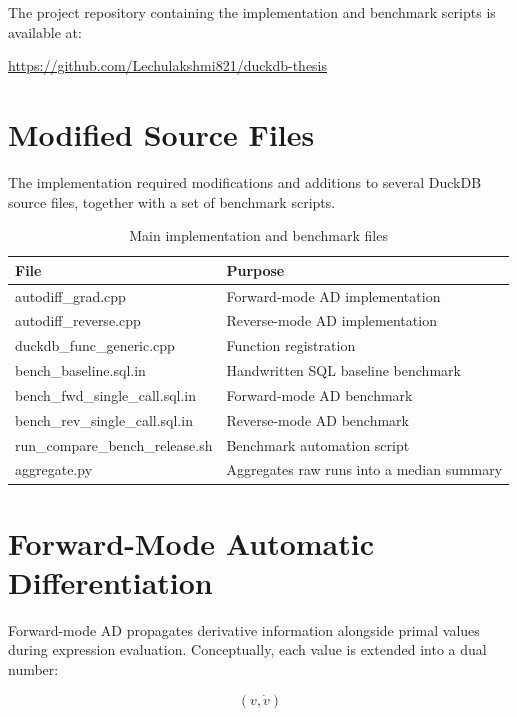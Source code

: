 \documentclass[12pt]{report}
\begin{document}
The project repository containing the implementation and benchmark scripts is available at:

\begin{center}
\url{https://github.com/Lechulakshmi821/duckdb-thesis}
\end{center}

\section{Modified Source Files}

The implementation required modifications and additions to several DuckDB source files, together with a set of benchmark scripts.

\begin{table}[H]
\centering
\begin{tabular}{|l|l|}
\hline
File & Purpose \\
\hline
autodiff\_grad.cpp & Forward-mode AD implementation \\
autodiff\_reverse.cpp & Reverse-mode AD implementation \\
duckdb\_func\_generic.cpp & Function registration \\
bench\_baseline.sql.in & Handwritten SQL baseline benchmark \\
bench\_fwd\_single\_call.sql.in & Forward-mode AD benchmark \\
bench\_rev\_single\_call.sql.in & Reverse-mode AD benchmark \\
run\_compare\_bench\_release.sh & Benchmark automation script \\
aggregate.py & Aggregates raw runs into a median summary \\
\hline
\end{tabular}
\caption{Main implementation and benchmark files}
\label{tab:impl-files}
\end{table}

\section{Forward-Mode Automatic Differentiation}

Forward-mode AD propagates derivative information alongside primal values during expression evaluation. Conceptually, each value is extended into a dual number:

\begin{equation}
(v, \dot{v})
\label{eq:dual-number}
\end{equation}
\end{document}
